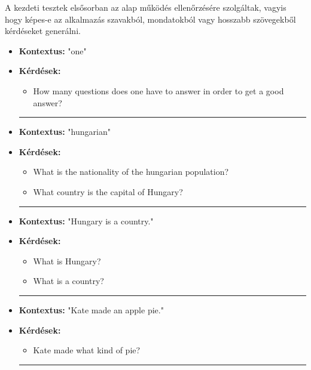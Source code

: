\pagebreak

A kezdeti tesztek elsősorban az alap működés ellenőrzésére szolgáltak, vagyis hogy képes-e az alkalmazás szavakból, mondatokból vagy hosszabb szövegekből kérdéseket generálni.

\begin{itemize}
\item \textbf{Kontextus:} "one"
\item \textbf{Kérdések:} 
	\begin{itemize}
		\item How many questions does one have to answer in order to get a good answer?
	\end{itemize}
	
\hrule	
	
\item \textbf{Kontextus:} "hungarian"
\item \textbf{Kérdések: }
	\begin{itemize}
		\item What is the nationality of the hungarian population?
		\item What country is the capital of Hungary?
	\end{itemize}
	
\hrule	
	
\item \textbf{Kontextus:} "Hungary is a country."
\item \textbf{Kérdések:}
	\begin{itemize}
		\item What is Hungary?
		\item What is a country?
	\end{itemize}
	
\hrule	
	
\item \textbf{Kontextus:} "Kate made an apple pie."
\item \textbf{Kérdések:}
	\begin{itemize}
		\item Kate made what kind of pie?
	\end{itemize}

\hrule	
	

\end{itemize}
